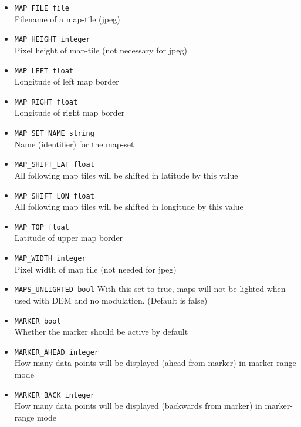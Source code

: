 \begin{itemize}
\item \texttt{MAP\_FILE file} \\
Filename of a map-tile (jpeg)

\item \texttt{MAP\_HEIGHT integer} \\
Pixel height of map-tile (not necessary for jpeg)

\item \texttt{MAP\_LEFT float} \\
Longitude of left map border

\item \texttt{MAP\_RIGHT float} \\
Longitude of right map border

\item \texttt{MAP\_SET\_NAME string} \\
Name (identifier) for the map-set

\item \texttt{MAP\_SHIFT\_LAT float} \\
All following map tiles will be shifted in latitude by this value

\item \texttt{MAP\_SHIFT\_LON float} \\
All following map tiles will be shifted in longitude by this value

\item \texttt{MAP\_TOP float} \\
Latitude of upper map border

\item \texttt{MAP\_WIDTH integer} \\
Pixel width of map tile (not needed for jpeg)

\item \texttt{MAPS\_UNLIGHTED bool}
With this set to true, maps will not be lighted when used with DEM and no modulation. (Default is false)

\item \texttt{MARKER bool} \\
Whether the marker should be active by default

\item \texttt{MARKER\_AHEAD integer} \\
How many data points will be displayed (ahead from marker) in marker-range mode

\item \texttt{MARKER\_BACK integer} \\
How many data points will be displayed (backwards from marker) in marker-range mode


\end{itemize}
